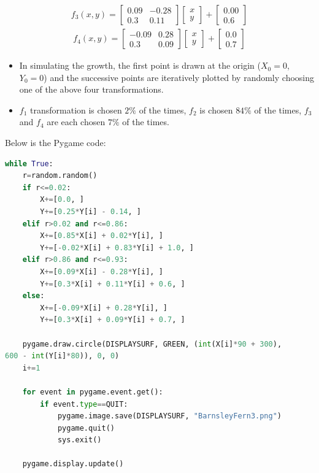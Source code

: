 \documentclass{article}
\begin{document}
\begin{gather}
f_3(x, y)=\begin{bmatrix}0.09 & -0.28 \\ 0.3 & 0.11 \end{bmatrix}\begin{bmatrix}x\\y\end{bmatrix} + \begin{bmatrix}0.00\\0.6\end{bmatrix}
\end{gather}
\begin{gather}
f_4(x, y)=\begin{bmatrix}-0.09 & 0.28\\ 0.3 & 0.09 \end{bmatrix}\begin{bmatrix}x\\y\end{bmatrix} + \begin{bmatrix}0.0\\0.7\end{bmatrix}
\end{gather}

\begin{itemize}
\item In simulating the growth, the first point is drawn at the origin ($X_0=0$, $Y_0=0$) and the successive points are iteratively plotted by randomly choosing one of the above four transformations.
\item $f_1$ transformation is chosen $2\%$ of the times, $f_2$ is chosen $84\%$ of the times, $f_3$ and $f_4$ are each chosen $7\%$ of the times.
\end{itemize}

Below is the Pygame code:
\begin{lstlisting}[language=Python, frame=single]
while True:
    r=random.random() 
    if r<=0.02:
        X+=[0.0, ]
        Y+=[0.25*Y[i] - 0.14, ]
    elif r>0.02 and r<=0.86:
        X+=[0.85*X[i] + 0.02*Y[i], ]
        Y+=[-0.02*X[i] + 0.83*Y[i] + 1.0, ]
    elif r>0.86 and r<=0.93:
        X+=[0.09*X[i] - 0.28*Y[i], ]
        Y+=[0.3*X[i] + 0.11*Y[i] + 0.6, ]
    else:
        X+=[-0.09*X[i] + 0.28*Y[i], ]
        Y+=[0.3*X[i] + 0.09*Y[i] + 0.7, ]
    
    pygame.draw.circle(DISPLAYSURF, GREEN, (int(X[i]*90 + 300),
600 - int(Y[i]*80)), 0, 0)
    i+=1
    
    for event in pygame.event.get():
        if event.type==QUIT:
            pygame.image.save(DISPLAYSURF, "BarnsleyFern3.png")
            pygame.quit()
            sys.exit()

    pygame.display.update()
\end{lstlisting}
\end{document}
